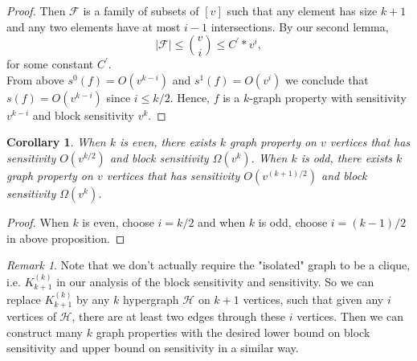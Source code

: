 \documentclass[psamsfonts]{amsart}
\newtheorem{cor}[thm]{Corollary}
\theoremstyle{definition}
\theoremstyle{remark}
\newtheorem{rem}[thm]{Remark}
\numberwithin{equation}{section}
\begin{document}
\begin{proof}
		\indent Then $\mathcal{F}$ is a family of subsets of $[v]$ such that any element has size $k+1$ and any two elements have at most $i-1$ intersections. By our second lemma,
		\begin{equation}
			|\mathcal{F}| \leq {v \choose{i}} \leq C^{\prime} * v^i,
		\end{equation}
		for some constant $C^\prime$.\\
		\indent From above $s^0(f) = O(v^{k-i})$ and $s^1(f) = O(v^{i})$ we conclude that $s(f) = O(v^{k-i})$ since $i \leq k/2$. Hence, $f$ is a $k$-graph property with sensitivity $v^{k-i}$ and block sensitivity $v^{k}$.
	\end{proof}
	
	\begin{cor}
		When $k$ is even, there exists $k$ graph property on $v$ vertices that has sensitivity $O(v^{k/2})$ and block sensitivity $\Omega (v^k)$. When $k$ is odd, there exists $k$ graph property on $v$ vertices that has sensitivity $O(v^{(k+1)/2})$ and block sensitivity $\Omega (v^k)$.
	\end{cor}
	\begin{proof}
		When $k$ is even, choose $i=k/2$ and when $k$ is odd, choose $i=(k-1)/2$ in above proposition.
	\end{proof}
	
	\begin{rem}
		Note that we don't actually require the "isolated" graph to be a clique, i.e. $K_{k+1}^{(k)}$ in our analysis of the block sensitivity and sensitivity. So we can replace $K_{k+1}^{(k)}$ by any $k$ hypergraph $\mathcal{H}$ on $k+1$ vertices, such that given any $i$ vertices of $\mathcal{H}$, there are at least two edges through these $i$ vertices. Then we can construct many $k$ graph properties with the desired lower bound on block sensitivity and upper bound on sensitivity in a similar way.
	\end{rem}
\end{document}
